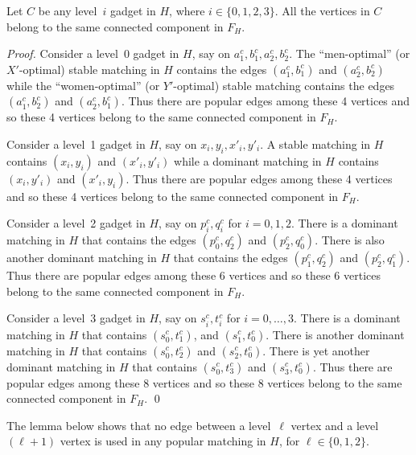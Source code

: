 \documentclass{llncs}
\begin{document}
\begin{lemma}
  \label{lem:conn-comp}
   Let $C$ be any level~$i$ gadget in $H$, where $i \in \{0,1,2,3\}$. All the vertices in $C$ belong to the same connected component in $F_H$.
\end{lemma}
\begin{proof}
  Consider a level~0 gadget in $H$, say on $a^c_1,b^c_1,a^c_2,b^c_2$. The ``men-optimal'' (or $X'$-optimal) stable matching in $H$ contains
  the edges $(a^c_1,b^c_1)$ and $(a^c_2,b^c_2)$ while the ``women-optimal'' (or $Y'$-optimal) stable matching contains the edges $(a^c_1,b^c_2)$ and $(a^c_2,b^c_1)$.
  Thus there are popular edges among these 4 vertices and so these 4 vertices belong to the same connected component in $F_H$.

  
  
  Consider a level~1 gadget in $H$, say on $x_i,y_i,x'_i,y'_i$. A stable matching in $H$ contains $(x_i,y_i)$ and $(x'_i,y'_i)$ while
  a dominant matching in $H$ contains $(x_i,y'_i)$ and $(x'_i,y_i)$. Thus there are popular edges among these 4 vertices
  and so these 4 vertices belong to the same connected component in $F_H$.

  

  Consider a level~2 gadget in $H$, say on $p^c_i,q^c_i$ for $i = 0,1,2$.
  There is a dominant matching in $H$ that contains the edges $(p^c_0,q^c_2)$ and $(p^c_2,q^c_0)$.
  There is also another dominant matching in $H$ that contains the edges $(p^c_1,q^c_2)$ and $(p^c_2,q^c_1)$.
  Thus there are popular edges among these 6 vertices and so these 6 vertices  belong to the same connected component in $F_H$.
  
  

  Consider a level~3 gadget in $H$, say on $s^c_i,t^c_i$ for $i = 0,\ldots,3$.
  There is a dominant matching in $H$ that contains $(s^c_0,t^c_1)$, and $(s^c_1,t^c_0)$.
  There is another dominant matching in $H$ that contains $(s^c_0,t^c_2)$ and $(s^c_2,t^c_0)$. 
  There is yet another dominant matching in $H$ that contains $(s^c_0,t^c_3)$ and $(s^c_3,t^c_0)$. 
  Thus there are popular edges among these 8 vertices and so these 8 vertices belong to the same connected component in $F_H$. \qed
\end{proof}  

The lemma below shows that no edge between a level~$\ell$ vertex and a level~$(\ell+1)$ vertex is used in any popular matching in $H$, for $\ell \in \{0,1,2\}$. 
\end{document}
